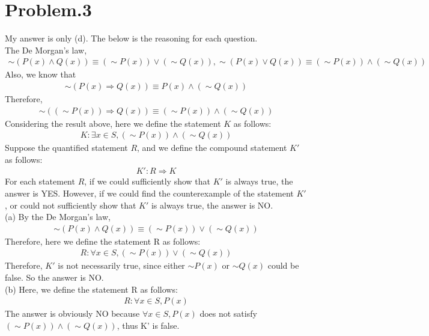 \documentclass[12pt]{article}
\begin{document}
\section*{Problem.3}
My answer is only (d). The below is the reasoning for each question.\\
The De Morgan's law,
\begin{gather*}
\sim (P(x) \land Q(x)) \equiv (\sim P(x)) \lor (\sim Q(x)), \sim (P(x) \lor Q(x)) \equiv (\sim P(x)) \land (\sim Q(x))
\end{gather*}
Also, we know that
\begin{gather*}
\sim (P(x) \Rightarrow Q(x)) \equiv P(x) \land (\sim Q(x))
\end{gather*}
Therefore,
\begin{gather*}
\sim((\sim P(x)) \Rightarrow Q(x)) \equiv (\sim P(x)) \land (\sim Q(x))
\end{gather*}
Considering the result above, here we define the statement $K$ as follows:
\begin{gather*}
K: \exists x \in S, (\sim P(x)) \land (\sim Q(x))
\end{gather*}
Suppose the quantified statement $R$, and we define the compound statement $K'$ as follows:
\begin{gather*}
K': R \Rightarrow K
\end{gather*}
 For each statement $R$, if we could sufficiently show that $K'$ is always true, the answer is YES. However, if we could find the counterexample of the statement $K'$, or could not sufficiently show that $K'$ is always true, the answer is NO.\\[1em]
(a) By the De Morgan's law,
\begin{gather*}
\sim (P(x) \land Q(x)) \equiv (\sim P(x)) \lor (\sim Q(x))
\end{gather*}
Therefore, here we define the statement R as follows:
\begin{gather*}
R: \forall  x \in S, (\sim P(x)) \lor (\sim Q(x))
\end{gather*}
Therefore, $K'$ is not necessarily true, since either $\sim P(x)$ or $\sim Q(x)$ could be false. So the answer is NO.\\[1em]
(b)
Here, we define the statement R as follows:
\begin{gather*}
R: \forall  x \in S, P(x)
\end{gather*}
The answer is obviously NO because $\forall  x \in S, P(x)$ does not satisfy $(\sim P(x)) \land (\sim Q(x))$, thus K' is false.\\[1em]
\end{document}
